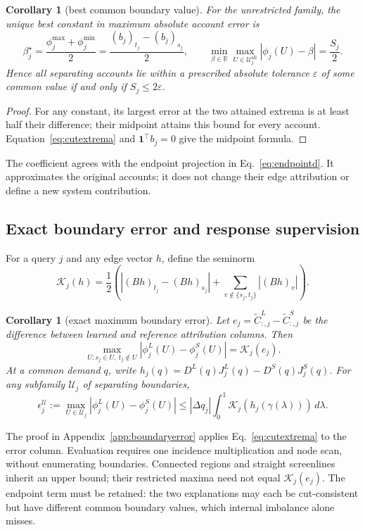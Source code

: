 \documentclass[a4paper,fleqn]{cas-sc}
\newtheorem{corollary}[theorem]{Corollary}
\begin{document}
\begin{corollary}[best common boundary value]\label{cor:approxinterchange}
For the unrestricted family, the unique best constant in maximum absolute
account error is
\[
\beta_j^\star=\frac{\phi_j^{\max}+\phi_j^{\min}}2
=\frac{(b_j)_{t_j}-(b_j)_{s_j}}2,\qquad
\min_{\beta\in\mathbb R}\max_{U\in\mathcal U_j^{\mathrm{all}}}
|\phi_j(U)-\beta|=\frac{S_j}{2}.
\]
Hence all separating accounts lie within a prescribed absolute tolerance
$\varepsilon$ of some common value if and only if $S_j\le2\varepsilon$.
\end{corollary}
\begin{proof}
For any constant, its largest error at the two attained extrema is at least
half their difference; their midpoint attains this bound for every account.
Equation~\eqref{eq:cutextrema} and $\mathbf1^\top b_j=0$ give the midpoint formula.
\end{proof}
The coefficient agrees with the endpoint projection in
Eq.~\eqref{eq:endpointd}. It approximates the original accounts; it does
not change their edge attribution or define a new system contribution.

\subsection{Exact boundary error and response supervision}\label{sec:boundarylearning}
For a query $j$ and any edge vector $h$, define the seminorm
\begin{equation}
\mathcal K_j(h)=\frac12\left(\left|(Bh)_{t_j}-(Bh)_{s_j}\right|
+\sum_{v\notin\{s_j,t_j\}}|(Bh)_v|\right).
\label{eq:boundaryseminorm}
\end{equation}
\begin{corollary}[exact maximum boundary error]\label{cor:boundaryerror}
Let $e_j=\widetilde C^L_{:,j}-\widetilde C^S_{:,j}$ be the difference
between learned and reference attribution columns. Then
\begin{equation}
\max_{U:s_j\in U,\ t_j\notin U}|\phi_j^L(U)-\phi_j^S(U)|
=\mathcal K_j(e_j).\label{eq:exactboundaryerror}
\end{equation}
At a common demand $q$, write
$h_j(q)=D^L(q)J_j^L(q)-D^S(q)J_j^S(q)$.
For any subfamily $\mathcal U_j$ of separating boundaries,
\begin{equation}
\epsilon_j^{\mathcal U}:=\max_{U\in\mathcal U_j}|\phi_j^L(U)-\phi_j^S(U)|
\le |\Delta q_j|\int_0^1\mathcal K_j(h_j(\gamma(\lambda)))\,d\lambda.
\label{eq:localboundarybound}
\end{equation}
\end{corollary}
The proof in Appendix~\ref{app:boundaryerror} applies
Eq.~\eqref{eq:cutextrema} to the error column. Evaluation requires one
incidence multiplication and node scan, without enumerating boundaries.
Connected regions and straight screenlines inherit an upper bound; their
restricted maxima need not equal $\mathcal K_j(e_j)$. The endpoint term
must be retained: the two explanations may each be cut-consistent but
have different common boundary values, which internal imbalance alone misses.
\end{document}
